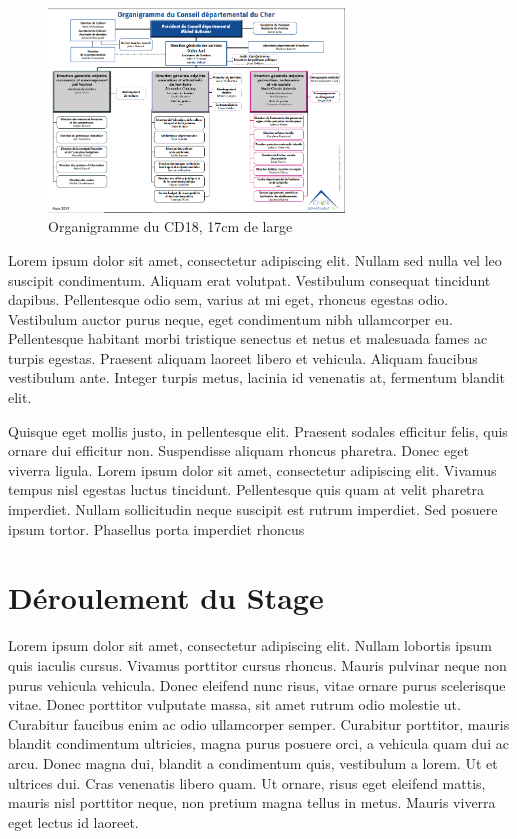 \documentclass[a4paper,12pt]{report}
\begin{document}
\begin{figure}[h]
  \centering
  \includegraphics[width=0.7\textwidth]{image/images/organigrammeconseil}
  \caption{Organigramme du CD18, 17cm de large}
\end{figure}


Lorem ipsum dolor sit amet, consectetur adipiscing elit. Nullam sed nulla vel leo suscipit condimentum. Aliquam erat volutpat. Vestibulum consequat tincidunt dapibus. Pellentesque odio sem, varius at mi eget, rhoncus egestas odio. Vestibulum auctor purus neque, eget condimentum nibh ullamcorper eu. Pellentesque habitant morbi tristique senectus et netus et malesuada fames ac turpis egestas. Praesent aliquam laoreet libero et vehicula. Aliquam faucibus vestibulum ante. Integer turpis metus, lacinia id venenatis at, fermentum blandit elit.

Quisque eget mollis justo, in pellentesque elit. Praesent sodales efficitur felis, quis ornare dui efficitur non. Suspendisse aliquam rhoncus pharetra. Donec eget viverra ligula. Lorem ipsum dolor sit amet, consectetur adipiscing elit. Vivamus tempus nisl egestas luctus tincidunt. Pellentesque quis quam at velit pharetra imperdiet. Nullam sollicitudin neque suscipit est rutrum imperdiet. Sed posuere ipsum tortor. Phasellus porta imperdiet rhoncus

\chapter{Déroulement du Stage} %
Lorem ipsum dolor sit amet, consectetur adipiscing elit. Nullam lobortis ipsum quis iaculis cursus. Vivamus porttitor cursus rhoncus. Mauris pulvinar neque non purus vehicula vehicula. Donec eleifend nunc risus, vitae ornare purus scelerisque vitae. Donec porttitor vulputate massa, sit amet rutrum odio molestie ut. Curabitur faucibus enim ac odio ullamcorper semper. Curabitur porttitor, mauris blandit condimentum ultricies, magna purus posuere orci, a vehicula quam dui ac arcu. Donec magna dui, blandit a condimentum quis, vestibulum a lorem. Ut et ultrices dui. Cras venenatis libero quam. Ut ornare, risus eget eleifend mattis, mauris nisl porttitor neque, non pretium magna tellus in metus. Mauris viverra eget lectus id laoreet.
\end{document}
